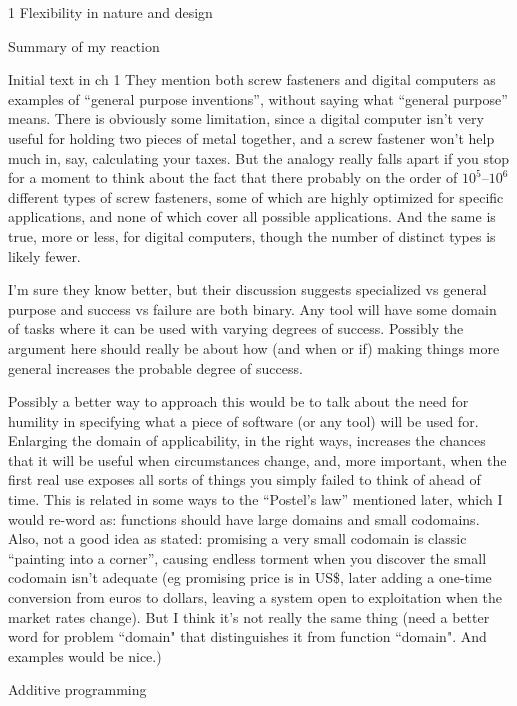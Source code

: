 \documentclass[12pt]{PalisadesLakesBook}
\begin{document}
\begin{plSection}{1 Flexibility in nature and design}
\begin{plSection}{Summary of my reaction}
\end{plSection}%
\begin{plSection}{Initial text in ch 1}
They mention both screw fasteners and digital computers
as examples  of ``general purpose inventions'',
without saying what ``general purpose'' means.
There is obviously some limitation,
since a digital computer isn't very useful for holding two pieces 
of metal together, and a screw fastener won't help much in, say,
calculating your taxes. 
But the analogy really falls apart if you stop for a moment to
think about the fact that there probably on the order of 
$10^{5}\text{--}10^{6}$ different types of screw fasteners,
some  of which are highly optimized for specific applications,
and none of which cover all possible applications.
And the same is true, more or less, for digital computers,
though the number of distinct types is likely fewer.

I'm sure they know better, 
but their discussion suggests
specialized vs general purpose
and success vs failure are both binary.
Any tool will have some domain of tasks where it can be used
with varying degrees of success.
Possibly the argument here should really be about 
how (and when or if) making things more general increases
the probable degree of success. 

Possibly a better way to approach this
would be to talk about the need for humility in specifying
what a piece of software (or any tool) will be used for.
Enlarging the domain of applicability, in the right ways,
increases the chances that it will be useful when circumstances 
change, and, more important, 
when the first real use exposes all sorts of things 
you simply failed to think of ahead of time.
This is related in some ways to the ``Postel's law''
mentioned later, which I would re-word as:
functions should have large domains and small codomains.
Also, not a good idea as stated:
promising a very small codomain is classic
``painting into a corner'',
causing endless torment when you discover the small codomain
isn't adequate
(eg promising {\pseudocodeFont price} is in US\$,
later adding a one-time conversion from euros to dollars,
leaving a system open to exploitation 
when the market rates change).
But I think it's not really the same thing
(\TODO need a better word for problem ``domain"
that distinguishes it from function ``domain".
And examples would be nice.)

\begin{plSection}{Additive programming}
\label{sec:AdditiveProgramming}


\end{plSection}
\end{plSection}
\end{plSection}
\end{document}
